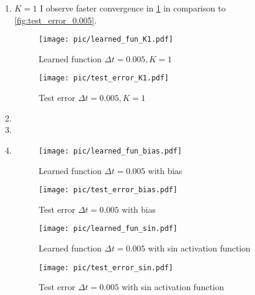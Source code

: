 \documentclass[a4paper,11pt]{scrartcl}
\newcommand*{\Dt}{\Delta{}t}
\begin{document}
\begin{enumerate}
\begin{enumerate}[leftmargin=1em]
  \item $K=1$
    I observe faster convergence in \cref{fig:test_error_K1} in comparison to \cref{fig:test_error_0.005}.
    \begin{figure}[h]
        \begin{minipage}[b]{.5\linewidth}
          \centering
          \texttt{[image: pic/learned\_fun\_K1.pdf]}
          \caption{Learned function $\Dt=0.005, K=1$}
          \label{fig:learned_fun_K1}
        \end{minipage}%
        \begin{minipage}[b]{.5\linewidth}
          \centering
          \texttt{[image: pic/test\_error\_K1.pdf]}
          \caption{Test error $\Dt=0.005, K=1$}
          \label{fig:test_error_K1}
        \end{minipage}
    \end{figure}

   \item

   \item

   \item
    \begin{figure}[h]
        \begin{minipage}[b]{.5\linewidth}
          \centering
          \texttt{[image: pic/learned\_fun\_bias.pdf]}
          \caption{Learned function $\Dt=0.005$ with bias}
          \label{fig:learned_fun_bias}
        \end{minipage}%
        \begin{minipage}[b]{.5\linewidth}
          \centering
          \texttt{[image: pic/test\_error\_bias.pdf]}
          \caption{Test error $\Dt=0.005$ with bias}
          \label{fig:test_error_bias}
        \end{minipage}
    \end{figure}

    \begin{figure}[h]
        \begin{minipage}[b]{.5\linewidth}
          \centering
          \texttt{[image: pic/learned\_fun\_sin.pdf]}
          \caption{Learned function $\Dt=0.005$ with sin activation function}
          \label{fig:learned_fun_sin}
        \end{minipage}%
        \begin{minipage}[b]{.5\linewidth}
          \centering
          \texttt{[image: pic/test\_error\_sin.pdf]}
          \caption{Test error $\Dt=0.005$ with sin activation function}
          \label{fig:test_error_sin}
        \end{minipage}
    \end{figure}


\end{enumerate}
\end{enumerate}
\end{document}
